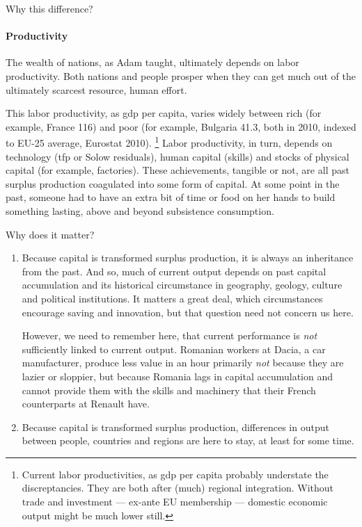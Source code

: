 Why this difference?

\paragraph{Productivity}
The wealth of nations, as Adam \cite{Smith-1776-lq} taught, ultimately depends on labor productivity.
Both nations and people prosper when they can get much out of the ultimately scarcest resource, human effort.

This labor productivity, as \gls{gdp} per capita, varies widely between rich (for example, France 116) and poor (for example, Bulgaria 41.3, both in 2010, indexed to EU-25 average, Eurostat 2010).
\footnote{
	Current labor productivities, as \gls{gdp} per capita probably understate the discreptancies.
	They are both after (much) regional integration.
	Without trade and investment --- ex-ante EU membership --- domestic economic output might be much lower still.
}
Labor productivity, in turn, depends on technology (\gls{tfp} or Solow residuals), human capital (skills) and stocks of physical capital (for example, factories).
These achievements, tangible or not, are all past surplus production coagulated into some form of capital.
At some point in the past, someone had to have an extra bit of time or food on her hands to build something lasting, above and beyond subsistence consumption.


Why does it matter?

\begin{enumerate}
	\item Because capital is transformed surplus production, it is always an inheritance from the past.
	And so, much of current output depends on past capital accumulation and its historical circumstance in geography, geology, culture and political institutions.
	It matters a great deal, which circumstances encourage saving and innovation, but that question need not concern us here.

	However, we need to remember here, that current performance is \emph{not} sufficiently linked to current output.
	Romanian workers at Dacia, a car manufacturer, produce less value in an hour primarily \emph{not} because they are lazier or sloppier, but because Romania lags in capital accumulation and cannot provide them with the skills and machinery that their French counterparts at Renault have.

	\item Because capital is transformed surplus production, differences in output between people, countries and regions are here to stay, at least for some time.
\end{enumerate}

